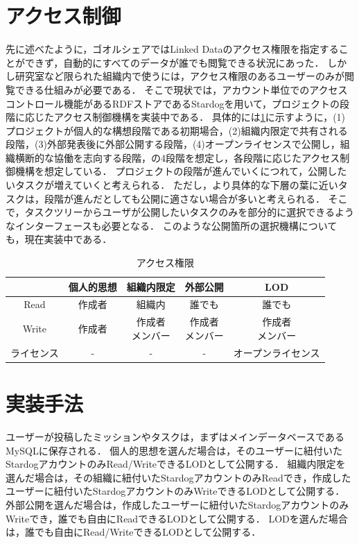 \section{アクセス制御}
先に述べたように，ゴオルシェアではLinked Dataのアクセス権限を指定することができず，自動的にすべてのデータが誰でも閲覧できる状況にあった．
しかし研究室など限られた組織内で使うには，アクセス権限のあるユーザーのみが閲覧できる仕組みが必要である．
そこで現状では，アカウント単位でのアクセスコントロール機能があるRDFストアであるStardogを用いて，プロジェクトの段階に応じたアクセス制御機構を実装中である．
具体的には\ref{table:permission_table}に示すように，(1)プロジェクトが個人的な構想段階である初期場合，(2)組織内限定で共有される段階，(3)外部発表後に外部公開する段階，(4)オープンライセンスで公開し，組織横断的な協働を志向する段階，の4段階を想定し，各段階に応じたアクセス制御機構を想定している．
プロジェクトの段階が進んでいくにつれて，公開したいタスクが増えていくと考えられる．
ただし，より具体的な下層の葉に近いタスクは，段階が進んだとしても公開に適さない場合が多いと考えられる．
そこで，タスクツリーからユーザが公開したいタスクのみを部分的に選択できるようなインターフェースも必要となる．
このような公開箇所の選択機構についても，現在実装中である．

\begin{table}[t]
 \caption{アクセス権限}
 \begin{center}
	 \begin{tabular}{ | c || c | c | c | c | } \hline
		  & 個人的思想 & 組織内限定 & 外部公開 & LOD \\ \hline \hline
			Read & 作成者 & 組織内 & 誰でも & 誰でも \\ \hline
			Write & 作成者 & \shortstack{ 作成者 \\ メンバー } & \shortstack{ 作成者 \\ メンバー } & \shortstack{ 作成者 \\ メンバー } \\ \hline
			ライセンス & - & - & - & オープンライセンス \\ \hline
	 \end{tabular}
	 \label{table:permission_table}
 \end{center}
\end{table}

\section{実装手法}
ユーザーが投稿したミッションやタスクは，まずはメインデータベースであるMySQLに保存される．
個人的思想を選んだ場合は，そのユーザーに紐付いたStardogアカウントのみRead/WriteできるLODとして公開する．
組織内限定を選んだ場合は，その組織に紐付いたStardogアカウントのみReadでき，作成したユーザーに紐付いたStardogアカウントのみWriteできるLODとして公開する．
外部公開を選んだ場合は，作成したユーザーに紐付いたStardogアカウントのみWriteでき，誰でも自由にReadできるLODとして公開する．
LODを選んだ場合は，誰でも自由にRead/WriteできるLODとして公開する．

